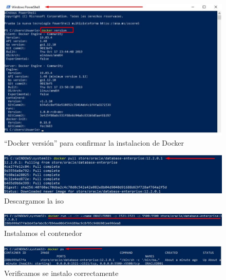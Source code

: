 \documentclass[preprint,12pt]{elsarticle}
\begin{document}
\begin{figure}[H]
	\begin{center}
		\includegraphics[width=12cm]{./IMAGENES/foto5} 
		\caption{“Docker versión” para confirmar la instalacion de Docker}
	\end{center}
\end{figure}


\begin{figure}[H]
	\begin{center}
		\includegraphics[width=12cm]{./IMAGENES/foto6} 
		\caption{Descargamos la iso}
	\end{center}
\end{figure}

\begin{figure}[H]
	\begin{center}
		\includegraphics[width=12cm]{./IMAGENES/foto10} 
		\caption{Instalamos el contenedor}
	\end{center}
\end{figure}

\begin{figure}[H]
	\begin{center}
		\includegraphics[width=12cm]{./IMAGENES/foto11} 
		\caption{Verificamos se instalo correctamente}
	\end{center}
\end{figure}
\end{document}
